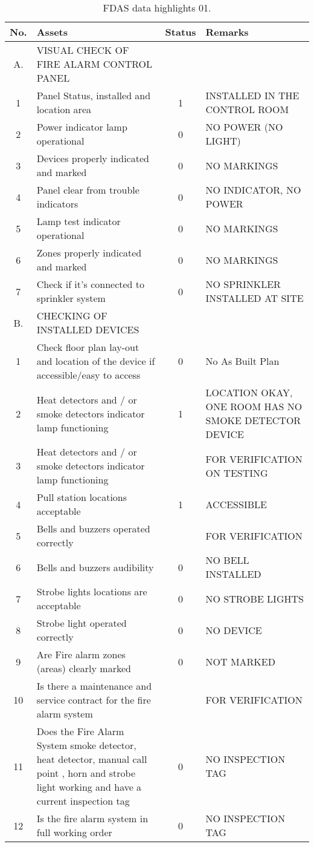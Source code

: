 \begin{table}[!h]
	\caption{FDAS data highlights 01.}
	\label{ch04_tbl_fdas01}
	{\scriptsize
\begin{tabular}{c|p{6.5cm}|c|p{5.5cm}}
	\hline
	No. & Assets & Status & Remarks \\ 
\hline
A. & VISUAL CHECK OF FIRE ALARM CONTROL PANEL &  &  \\ 
1 & Panel Status, installed and location area & 1 & INSTALLED IN THE CONTROL ROOM \\ 
2 & Power indicator lamp operational & 0 & NO POWER (NO LIGHT) \\ 
3 & Devices properly indicated and marked & 0 & NO MARKINGS \\ 
4 & Panel clear from trouble indicators & 0 & NO INDICATOR, NO POWER \\ 
5 & Lamp test indicator operational & 0 & NO MARKINGS \\ 
6 & Zones properly indicated and marked & 0 & NO MARKINGS \\ 
7 & Check if it’s connected to sprinkler system & 0 & NO SPRINKLER INSTALLED AT SITE \\ 
\hline
B. & CHECKING OF INSTALLED DEVICES &  &  \\ 
1 & Check floor plan lay-out and location of the device if accessible/easy to access & 0 & No As Built Plan \\ 
2 & Heat detectors and / or smoke detectors indicator lamp functioning & 1 & LOCATION OKAY, ONE ROOM HAS NO  SMOKE DETECTOR DEVICE \\ 
3 & Heat detectors and / or smoke detectors indicator lamp functioning &  & FOR VERIFICATION ON TESTING \\ 
4 & Pull station locations acceptable & 1 & ACCESSIBLE \\ 
5 & Bells and buzzers operated correctly &  & FOR VERIFICATION \\ 
6 & Bells and buzzers audibility & 0 & NO BELL INSTALLED \\ 
7 & Strobe lights locations are acceptable & 0 & NO STROBE LIGHTS \\ 
8 & Strobe light operated correctly & 0 & NO DEVICE \\ 
9 & Are Fire alarm zones (areas) clearly marked & 0 & NOT MARKED \\ 
10 & Is there a maintenance and service contract for the fire alarm system &  & FOR VERIFICATION \\ 
11 & Does the Fire Alarm System smoke detector, heat detector, manual call point , horn and strobe light working and  have a current inspection tag & 0 & NO INSPECTION TAG \\ 
12 & Is the fire alarm system in full working order & 0 & NO INSPECTION TAG \\ 
\hline
\end{tabular}

	}
\end{table}